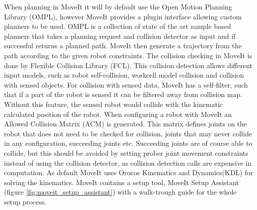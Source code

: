 When planning in MoveIt it will by default use the Open Motion Planning Library (OMPL), however MoveIt provides a plugin interface allowing custom planners to be used. OMPL is a collection of state of the art sample based planners that takes a planning request and collision detector as input and if successful returns a planned path. MoveIt then generate a trajectory from the path according to the given robot constraints. The collision checking in MoveIt is done by Flexible Collision Library (FCL). This collision detection allows different input models, such as robot self-collision, workcell model collision and collision with sensed objects. For collision with sensed data, MoveIt has a self-filter, such that if a part of the robot is sensed it can be filtered away from collision map. Without this feature, the sensed robot would collide with the kinematic calculated position of the robot. When configuring a robot with MoveIt an Allowed Collision Matrix (ACM) is generated. This matrix defines joints on the robot that does not need to be checked for collision, joints that may never collide in any configuration, succeeding joints etc. Succeeding joints are of course able to collide, but this should be avoided by setting prober joint movement constraints instead of using the collision detector, as collision detection calls are expensive in computation. As default MoveIt uses Orocos Kinematics and Dynamics(KDL) for solving the kinematics. MoveIt contains a setup tool, MoveIt Setup Assistant (figure \ref{fig:moveit_setup_assistant}) with a walk-trough guide for the whole setup process.


